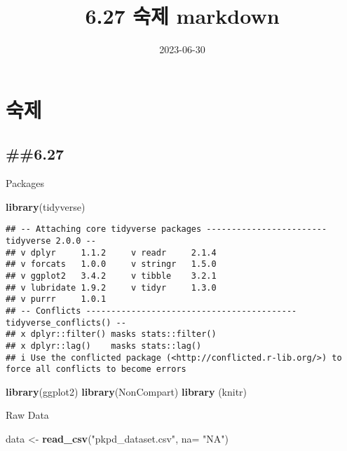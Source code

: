 \documentclass[
]{article}
\title{6.27 숙제 markdown}
\author{}
\date{\vspace{-2.5em}2023-06-30}
\newenvironment{Shaded}{\begin{snugshade}}{\end{snugshade}}
\newcommand{\AttributeTok}[1]{\textcolor[rgb]{0.13,0.29,0.53}{#1}}
\newcommand{\FunctionTok}[1]{\textcolor[rgb]{0.13,0.29,0.53}{\textbf{#1}}}
\newcommand{\NormalTok}[1]{#1}
\newcommand{\OtherTok}[1]{\textcolor[rgb]{0.56,0.35,0.01}{#1}}
\newcommand{\StringTok}[1]{\textcolor[rgb]{0.31,0.60,0.02}{#1}}
\begin{document}
\maketitle

\hypertarget{uxc219uxc81c}{%
\section{숙제}\label{uxc219uxc81c}}

\hypertarget{section}{%
\subsection{\#\#6.27}\label{section}}

Packages

\begin{Shaded}
\begin{Highlighting}[]
\FunctionTok{library}\NormalTok{(tidyverse)}
\end{Highlighting}
\end{Shaded}

\begin{verbatim}
## -- Attaching core tidyverse packages ------------------------ tidyverse 2.0.0 --
## v dplyr     1.1.2     v readr     2.1.4
## v forcats   1.0.0     v stringr   1.5.0
## v ggplot2   3.4.2     v tibble    3.2.1
## v lubridate 1.9.2     v tidyr     1.3.0
## v purrr     1.0.1     
## -- Conflicts ------------------------------------------ tidyverse_conflicts() --
## x dplyr::filter() masks stats::filter()
## x dplyr::lag()    masks stats::lag()
## i Use the conflicted package (<http://conflicted.r-lib.org/>) to force all conflicts to become errors
\end{verbatim}

\begin{Shaded}
\begin{Highlighting}[]
\FunctionTok{library}\NormalTok{(ggplot2)}
\FunctionTok{library}\NormalTok{(NonCompart)}
\FunctionTok{library}\NormalTok{ (knitr)}
\end{Highlighting}
\end{Shaded}

Raw Data

\begin{Shaded}
\begin{Highlighting}[]
\NormalTok{data }\OtherTok{\textless{}{-}}   \FunctionTok{read\_csv}\NormalTok{(}\StringTok{"pkpd\_dataset.csv"}\NormalTok{, }\AttributeTok{na=} \StringTok{"NA"}\NormalTok{)}
\end{Highlighting}
\end{Shaded}
\end{document}
